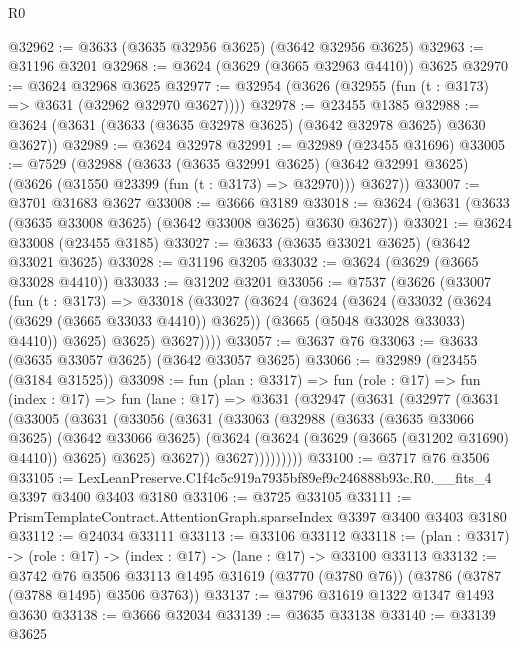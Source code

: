 \begin{lexlean}{R0}
\begin{coremodule}
@32962 := @3633 (@3635 @32956 @3625) (@3642 @32956 @3625)
@32963 := @31196 @3201
@32968 := @3624 (@3629 (@3665 @32963 @4410)) @3625
@32970 := @3624 @32968 @3625
@32977 := @32954 (@3626 (@32955 (fun (t : @3173) => @3631 (@32962 @32970 @3627))))
@32978 := @23455 @1385
@32988 := @3624 (@3631 (@3633 (@3635 @32978 @3625) (@3642 @32978 @3625) @3630 @3627))
@32989 := @3624 @32978
@32991 := @32989 (@23455 @31696)
@33005 := @7529
    (@32988
      (@3633
        (@3635 @32991 @3625)
        (@3642 @32991 @3625)
        (@3626 (@31550 @23399 (fun (t : @3173) => @32970)))
        @3627))
@33007 := @3701 @31683 @3627
@33008 := @3666 @3189
@33018 := @3624 (@3631 (@3633 (@3635 @33008 @3625) (@3642 @33008 @3625) @3630 @3627))
@33021 := @3624 @33008 (@23455 @3185)
@33027 := @3633 (@3635 @33021 @3625) (@3642 @33021 @3625)
@33028 := @31196 @3205
@33032 := @3624 (@3629 (@3665 @33028 @4410))
@33033 := @31202 @3201
@33056 := @7537
    (@3626
      (@33007
        (fun (t : @3173) =>
        @33018
          (@33027
            (@3624
              (@3624
                (@3624
                  (@33032 (@3624 (@3629 (@3665 @33033 @4410)) @3625))
                  (@3665 (@5048 @33028 @33033) @4410))
                @3625)
              @3625)
            @3627))))
@33057 := @3637 @76
@33063 := @3633 (@3635 @33057 @3625) (@3642 @33057 @3625)
@33066 := @32989 (@23455 (@3184 @31525))
@33098 := fun (plan : @3317) =>
  fun (role : @17) =>
  fun (index : @17) =>
  fun (lane : @17) =>
  @3631
    (@32947
      (@3631
        (@32977
          (@3631
            (@33005
              (@3631
                (@33056
                  (@3631
                    (@33063
                      (@32988
                        (@3633
                          (@3635 @33066 @3625)
                          (@3642 @33066 @3625)
                          (@3624 (@3624 (@3629 (@3665 (@31202 @31690) @4410)) @3625) @3625)
                          @3627))
                      @3627)))))))))
@33100 := @3717 @76 @3506
@33105 := LexLeanPreserve.C1f4c5c919a7935bf89ef9c246888b93c.R0.__fits_4 @3397 @3400 @3403 @3180
@33106 := @3725 @33105
@33111 := PrismTemplateContract.AttentionGraph.sparseIndex @3397 @3400 @3403 @3180
@33112 := @24034 @33111
@33113 := @33106 @33112
@33118 := (plan : @3317) -> (role : @17) -> (index : @17) -> (lane : @17) -> @33100 @33113
@33132 := @3742
    @76
    @3506
    @33113
    @1495
    @31619
    (@3770 (@3780 @76))
    (@3786 (@3787 (@3788 @1495) @3506 @3763))
@33137 := @3796 @31619 @1322 @1347 @1493 @3630
@33138 := @3666 @32034
@33139 := @3635 @33138
@33140 := @33139 @3625

\end{coremodule}
\end{lexlean}
